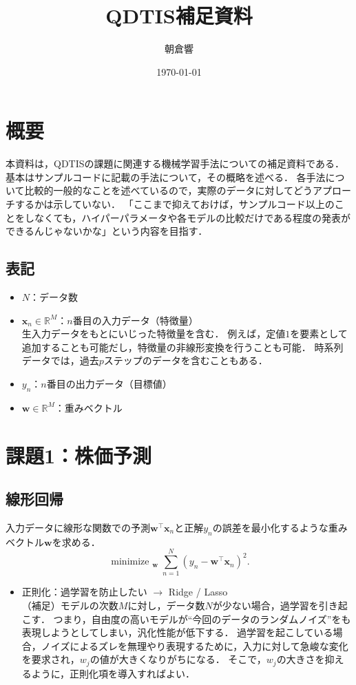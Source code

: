 \documentclass[a4paper,lualatex,ja=standard,oneside,fleqn]{bxjsarticle}
\title{QDTIS補足資料}
\author{朝倉響}
\date{\today}
\DeclareMathOperator*{\minimize}{minimize\ }
\begin{document}
\maketitle

\section*{概要}
本資料は，QDTISの課題に関連する機械学習手法についての補足資料である．
基本はサンプルコードに記載の手法について，その概略を述べる．
各手法について比較的一般的なことを述べているので，実際のデータに対してどうアプローチするかは示していない．
「ここまで抑えておけば，サンプルコード以上のことをしなくても，ハイパーパラメータや各モデルの比較だけである程度の発表ができるんじゃないかな」という内容を目指す．

\subsection*{表記}
\begin{itemize}
  \item $N$：データ数
  \item $\bm{x}_n\in\mathbb{R}^M$：$n$番目の入力データ（特徴量）\\
  生入力データをもとにいじった特徴量を含む．
  例えば，定値$1$を要素として追加することも可能だし，特徴量の非線形変換を行うことも可能．
  時系列データでは，過去$p$ステップのデータを含むこともある．
  \item $y_n$：$n$番目の出力データ（目標値）
  \item $\bm{w}\in\mathbb{R}^M$：重みベクトル
\end{itemize}

\section{課題1：株価予測}
\setcounter{subsection}{-1}
\subsection{線形回帰}
入力データに線形な関数での予測$\bm{w}^\top\bm{x}_n$と正解$y_n$の誤差を最小化するような重みベクトル$\bm{w}$を求める．
\begin{equation*}
  \minimize_{\bm{w}}\sum_{n=1}^N(y_n-\bm{w}^\top\bm{x}_n)^2.
\end{equation*}
\begin{itemize}
  \item 正則化：過学習を防止したい $\to$ Ridge / Lasso\\
  （補足）モデルの次数$M$に対し，データ数$N$が少ない場合，過学習を引き起こす．
  つまり，自由度の高いモデルが``今回のデータのランダムノイズ''をも表現しようとしてしまい，汎化性能が低下する．
  過学習を起こしている場合，ノイズによるズレを無理やり表現するために，入力に対して急峻な変化を要求され，$w_j$の値が大きくなりがちになる．
  そこで，$w_j$の大きさを抑えるように，正則化項を導入すればよい．
\end{itemize}
\end{document}
